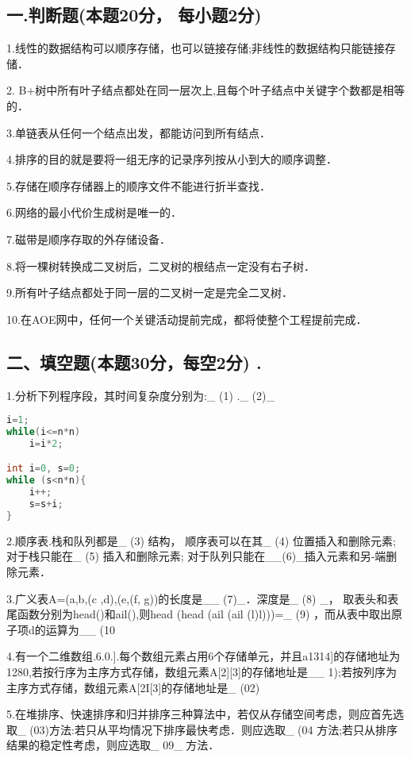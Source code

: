 
\subsection{一.判断题(本题20分， 每小题2分)}

1.线性的数据结构可以顺序存储，也可以链接存储;非线性的数据结构只能链接存储．

2. B+树中所有叶子结点都处在同一层次上,且每个叶子结点中关键字个数都是相等的．

3.单链表从任何一个结点出发，都能访问到所有结点．

4.排序的目的就是要将一组无序的记录序列按从小到大的顺序调整．

5.存储在顺序存储器上的顺序文件不能进行折半查找．

6.网络的最小代价生成树是唯一的．

7.磁带是顺序存取的外存储设备．

8.将一棵树转换成二叉树后，二叉树的根结点一定没有右子树．

9.所有叶子结点都处于同一层的二叉树一定是完全二叉树．

10.在AOE网中，任何一个关键活动提前完成，都将使整个工程提前完成．

\subsection{二、填空题(本题30分，每空2分) .}

1.分析下列程序段，其时间复杂度分别为:_ (1) ._ (2)_
\begin{lstlisting}[language=cpp]
i=1;
while(i<=n*n)
    i=i*2;

int i=0, s=0;
while (s<n*n){
    i++;
    s=s+i;
}
\end{lstlisting}

2.顺序表.栈和队列都是_ (3) 结构， 顺序表可以在其_ (4) 位置插入和删除元素;对于栈只能在_ (5) 插入和删除元素; 对于队列只能在__(6)_插入元素和另-端删除元素．

3.广义表A=(a,b,(c ,d),(e,(f, g))的长度是__ (7)_．深度是_ (8) _， 取表头和表尾函数分别为head()和ail(),则head (head (ail (ail (l)l)))=_ (9) ，而从表中取出原子项d的运算为__ (10

4.有一个二维数组.6.0.].每个数组元素占用6个存储单元，并且a1314]的存储地址为1280,若按行序为主序方式存储，数组元素A[2][3]的存储地址是__ 1);若按列序为主序方式存储，数组元素A[2I[3]的存储地址是_ (02)

5.在堆排序、快速排序和归并排序三种算法中，若仅从存储空间考虑，则应首先选取_ (03)方法:若只从平均情况下排序最快考虑．则应选取_ (04 方法;若只从排序结果的稳定性考虑，则应选取_ 09_ 方法．
